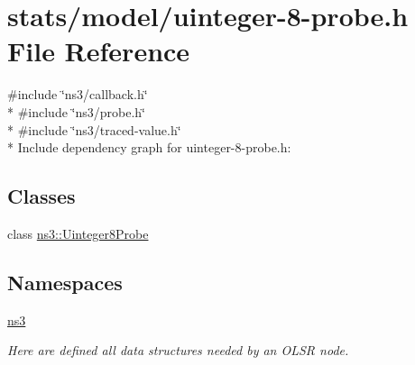 \hypertarget{uinteger-8-probe_8h}{}\section{stats/model/uinteger-\/8-\/probe.h File Reference}
\label{uinteger-8-probe_8h}
{\ttfamily \#include \char`\"{}ns3/callback.\+h\char`\"{}}\\*
{\ttfamily \#include \char`\"{}ns3/probe.\+h\char`\"{}}\\*
{\ttfamily \#include \char`\"{}ns3/traced-\/value.\+h\char`\"{}}\\*
Include dependency graph for uinteger-\/8-\/probe.h\+:
\subsection*{Classes}
\begin{DoxyCompactItemize}
\item 
class \hyperlink{classns3_1_1Uinteger8Probe}{ns3\+::\+Uinteger8\+Probe}
\end{DoxyCompactItemize}
\subsection*{Namespaces}
\begin{DoxyCompactItemize}
\item 
 \hyperlink{namespacens3}{ns3}
\begin{DoxyCompactList}\small\item\em Here are defined all data structures needed by an O\+L\+SR node. \end{DoxyCompactList}\end{DoxyCompactItemize}
